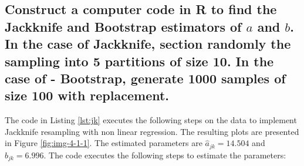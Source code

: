 \documentclass[]{article}
\begin{document}
\subsection{Construct a computer code in R to find the Jackknife and Bootstrap estimators of $a$ and $b$. In the case of Jackknife, section randomly the sampling into 5 partitions of size 10. In the case of -
	Bootstrap, generate 1000 samples of size 100 with replacement. }



The code in Listing \ref{lst:jk} executes the following steps on the data to implement Jackknife resampling with non linear regression. The resulting plots are presented in Figure \ref{fig:img-4-1-1}. The estimated parameters are $\hat{a}_{jk} = 14.504$ and $\hat{b}_{jk} = 6.996$. The code executes the following steps to estimate the parameters:
\end{document}
